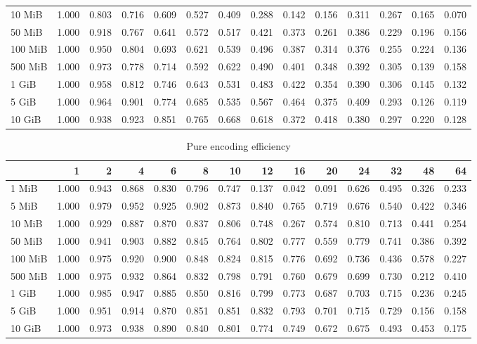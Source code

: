 \begin{centering}
\begin{table}[!h]
\begin{tabular}{lrrrrrrrrrrrrr}
		10 MiB  & 1.000 & 0.803 & 0.716 & 0.609 & 0.527 & 0.409 & 0.288 & 0.142 & 0.156 & 0.311 & 0.267 & 0.165 & 0.070 \\
		50 MiB  & 1.000 & 0.918 & 0.767 & 0.641 & 0.572 & 0.517 & 0.421 & 0.373 & 0.261 & 0.386 & 0.229 & 0.196 & 0.156 \\
		100 MiB & 1.000 & 0.950 & 0.804 & 0.693 & 0.621 & 0.539 & 0.496 & 0.387 & 0.314 & 0.376 & 0.255 & 0.224 & 0.136 \\
		500 MiB & 1.000 & 0.973 & 0.778 & 0.714 & 0.592 & 0.622 & 0.490 & 0.401 & 0.348 & 0.392 & 0.305 & 0.139 & 0.158 \\
		1 GiB   & 1.000 & 0.958 & 0.812 & 0.746 & 0.643 & 0.531 & 0.483 & 0.422 & 0.354 & 0.390 & 0.306 & 0.145 & 0.132 \\
		5 GiB   & 1.000 & 0.964 & 0.901 & 0.774 & 0.685 & 0.535 & 0.567 & 0.464 & 0.375 & 0.409 & 0.293 & 0.126 & 0.119 \\
		10 GiB  & 1.000 & 0.938 & 0.923 & 0.851 & 0.765 & 0.668 & 0.618 & 0.372 & 0.418 & 0.380 & 0.297 & 0.220 & 0.128 \\
		\bottomrule
	\end{tabular}
\end{table}
\begin{table}[!h]
	\caption{Pure encoding efficiency}
	\begin{tabular}{lrrrrrrrrrrrrr}
		\toprule
		\diagbox[width=7em]{Size}{Threads} &    1  &    2  &    4  &    6  &    8  &    10 &    12 &    16 &    20 &    24 &    32 &    48 &    64 \\
		\midrule
		1 MiB   & 1.000 & 0.943 & 0.868 & 0.830 & 0.796 & 0.747 & 0.137 & 0.042 & 0.091 & 0.626 & 0.495 & 0.326 & 0.233 \\
		5 MiB   & 1.000 & 0.979 & 0.952 & 0.925 & 0.902 & 0.873 & 0.840 & 0.765 & 0.719 & 0.676 & 0.540 & 0.422 & 0.346 \\
		10 MiB  & 1.000 & 0.929 & 0.887 & 0.870 & 0.837 & 0.806 & 0.748 & 0.267 & 0.574 & 0.810 & 0.713 & 0.441 & 0.254 \\
		50 MiB  & 1.000 & 0.941 & 0.903 & 0.882 & 0.845 & 0.764 & 0.802 & 0.777 & 0.559 & 0.779 & 0.741 & 0.386 & 0.392 \\
		100 MiB & 1.000 & 0.975 & 0.920 & 0.900 & 0.848 & 0.824 & 0.815 & 0.776 & 0.692 & 0.736 & 0.436 & 0.578 & 0.227 \\
		500 MiB & 1.000 & 0.975 & 0.932 & 0.864 & 0.832 & 0.798 & 0.791 & 0.760 & 0.679 & 0.699 & 0.730 & 0.212 & 0.410 \\
		1 GiB   & 1.000 & 0.985 & 0.947 & 0.885 & 0.850 & 0.816 & 0.799 & 0.773 & 0.687 & 0.703 & 0.715 & 0.236 & 0.245 \\
		5 GiB   & 1.000 & 0.951 & 0.914 & 0.870 & 0.851 & 0.851 & 0.832 & 0.793 & 0.701 & 0.715 & 0.729 & 0.156 & 0.158 \\
		10 GiB  & 1.000 & 0.973 & 0.938 & 0.890 & 0.840 & 0.801 & 0.774 & 0.749 & 0.672 & 0.675 & 0.493 & 0.453 & 0.175 \\
		\bottomrule
	\end{tabular}
\end{table}
\end{centering}